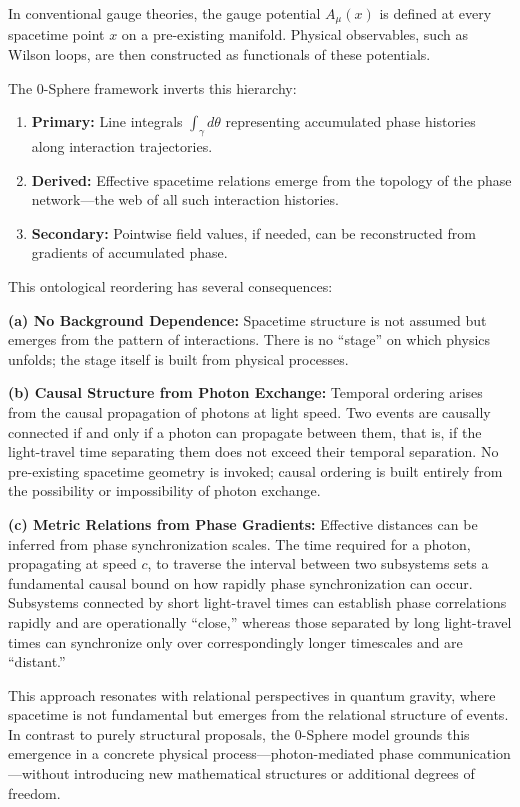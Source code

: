\documentclass[12pt,letterpaper]{article}
\begin{document}
In conventional gauge theories, the gauge potential $A_\mu(x)$ is defined at every spacetime point $x$ on a pre-existing manifold. Physical observables, such as Wilson loops, are then constructed as functionals of these potentials.

The 0-Sphere framework inverts this hierarchy:
\begin{enumerate}
\item \textbf{Primary:} Line integrals $\int_\gamma d\theta$ representing accumulated phase histories along interaction trajectories.
\item \textbf{Derived:} Effective spacetime relations emerge from the topology of the phase network—the web of all such interaction histories.
\item \textbf{Secondary:} Pointwise field values, if needed, can be reconstructed from gradients of accumulated phase.
\end{enumerate}

This ontological reordering has several consequences:

\textbf{(a) No Background Dependence:} Spacetime structure is not assumed but emerges from the pattern of interactions. There is no ``stage'' on which physics unfolds; the stage itself is built from physical processes.

\textbf{(b) Causal Structure from Photon Exchange:} Temporal ordering arises from the causal propagation of photons at light speed. Two events are causally connected if and only if a photon can propagate between them, that is, if the light-travel time separating them does not exceed their temporal separation. No pre-existing spacetime geometry is invoked; causal ordering is built entirely from the possibility or impossibility of photon exchange.

\textbf{(c) Metric Relations from Phase Gradients:} Effective distances can be inferred from phase synchronization scales. The time required for a photon, propagating at speed $c$, to traverse the interval between two subsystems sets a fundamental causal bound on how rapidly phase synchronization can occur. Subsystems connected by short light-travel times can establish phase correlations rapidly and are operationally ``close,'' whereas those separated by long light-travel times can synchronize only over correspondingly longer timescales and are ``distant.''

This approach resonates with relational perspectives in quantum gravity, where spacetime is not fundamental but emerges from the relational structure of events. In contrast to purely structural proposals, the 0-Sphere model grounds this emergence in a concrete physical process—photon-mediated phase communication—without introducing new mathematical structures or additional degrees of freedom.
\end{document}

